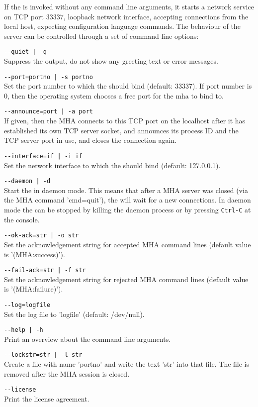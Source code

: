 If the \mhad{} is invoked without any command line arguments, it
starts a network service on TCP port 33337, loopback network interface,
accepting connections from the local host, expecting configuration language
commands.
%
The behaviour of the server can be controlled through a set of command
line options:
%
\begin{description}
\item\verb!--quiet | -q!\\Suppress the output, do not show any
greeting text or error messages.
\item\verb!--port=portno | -s portno!\\Set the port number to which
  the \mhad{} should bind (default: 33337). 
  If port number is 0, 
  then the operating system chooses a free port for the mha to bind to.
\item\verb!--announce=port | -a port!\\ If given, then the MHA connects to 
  this TCP port on the localhost after it has established its own TCP server 
  socket, and announces its process ID and the TCP server port in use, and
  closes the connection again. 
\item\verb!--interface=if | -i if!\\Set the network interface to which
the \mhad{} should bind (default: 127.0.0.1).
\item\verb!--daemon | -d!\\Start the \mhad{} in daemon
  mode. This means that after a MHA server was closed (via the MHA
  command 'cmd=quit'), the \mhad{} will wait for a new
  connections. In daemon mode the \mhad{} can be stopped by killing
  the daemon process or by pressing {\tt Ctrl-C} at the console.
\item\verb!--ok-ack=str | -o str!\\Set the acknowledgement string for
  accepted MHA command lines (default value is '(MHA:success)').
\item\verb!--fail-ack=str | -f str!\\Set the acknowledgement string
  for rejected MHA command lines (default value is
  '(MHA:failure)').
\item\verb!--log=logfile!\\Set the log file to 'logfile'
  (default: /dev/null).
\item\verb!--help | -h!\\Print an overview about the command line
  arguments.
\item\verb!--lockstr=str | -l str!\\Create a file with name 'portno'
and write the text 'str' into that file. The file is removed after the
MHA session is closed.
\item\verb!--license!\\Print the license agreement.
\end{description}

